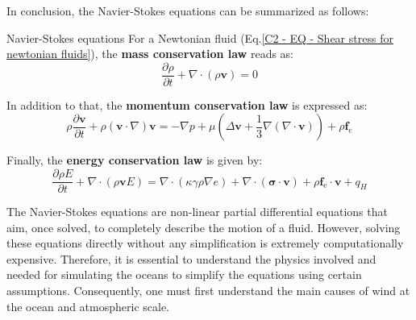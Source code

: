 \newpage

In conclusion, the Navier-Stokes equations can be summarized as follows:\\

\begin{box_definition}{Navier-Stokes equations}
For a Newtonian fluid (Eq.\ref{C2 - EQ - Shear stress for newtonian fluids}), the \textbf{mass conservation law} reads as:
\begin{equation}
	\frac{\partial \rho}{\partial t}+\nabla \cdot(\rho \mathbf{v})=0
	\label{C2 - EQ - Mass conservation law}
\end{equation}

In addition to that, the \textbf{momentum conservation law} is expressed as:
\begin{equation}
\rho \frac{\partial \mathbf{v}}{\partial t}+\rho(\mathbf{v} \cdot \nabla) \mathbf{v}=-\nabla p+\mu\left(\Delta \mathbf{v}+\frac{1}{3} \nabla(\nabla \cdot \mathbf{v})\right)+\rho \mathbf{f}_e
\label{C2 - EQ - Momentum conservation law}
\end{equation}

Finally, the \textbf{energy conservation law} is given by:
\begin{equation}
\frac{\partial \rho E}{\partial t}+\nabla \cdot(\rho \mathbf{v} E)=\nabla \cdot(\kappa \gamma \rho \nabla e)+\nabla \cdot(\boldsymbol{\sigma} \cdot \mathbf{v})+\rho \mathbf{f}_{\mathrm{e}} \cdot \mathbf{v}+q_H
\label{C2 - EQ - Energy conservation law}
\end{equation}
\end{box_definition}

The Navier-Stokes equations are non-linear partial differential equations that aim, once solved, to completely describe the motion of a fluid. However, solving these equations directly without any simplification is extremely computationally expensive. Therefore, it is essential to understand the physics involved and needed for simulating the oceans to simplify the equations using certain assumptions. Consequently, one must first understand the main causes of wind at the ocean and atmospheric scale.
\vspace{0.3em}

